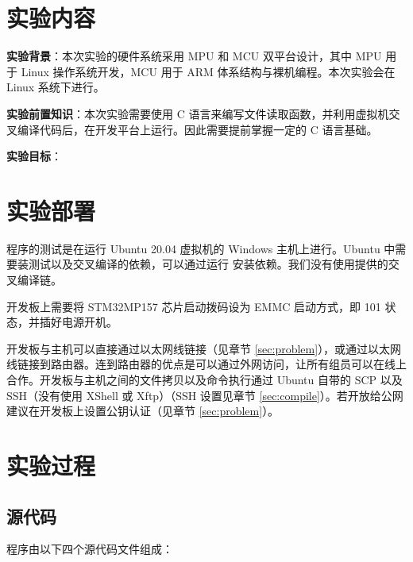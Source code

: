 
\section{实验内容}

\textbf{实验背景}：本次实验的硬件系统采用 MPU 和 MCU 双平台设计，其中 MPU 用于 Linux 操作系统开发，MCU 用于 ARM 体系结构与裸机编程。本次实验会在 Linux 系统下进行。

\textbf{实验前置知识}：本次实验需要使用 C 语言来编写文件读取函数，并利用虚拟机交叉编译代码后，在开发平台上运行。因此需要提前掌握一定的 C 语言基础。

\textbf{实验目标}：



\section{实验部署}

程序的测试是在运行 Ubuntu 20.04 虚拟机的 Windows 主机上进行。Ubuntu 中需要装测试以及交叉编译的依赖，可以通过运行  安装依赖。我们没有使用提供的交叉编译链。

开发板上需要将 STM32MP157 芯片启动拨码设为 EMMC 启动方式，即 101 状态，并插好电源开机。

开发板与主机可以直接通过以太网线链接（见章节 \ref{sec:problem}），或通过以太网线链接到路由器。连到路由器的优点是可以通过外网访问，让所有组员可以在线上合作。开发板与主机之间的文件拷贝以及命令执行通过 Ubuntu 自带的 SCP 以及 SSH（没有使用 XShell 或 Xftp）（SSH 设置见章节 \ref{sec:compile}）。若开放给公网建议在开发板上设置公钥认证（见章节 \ref{sec:problem}）。

\section{实验过程}

\subsection{源代码}

程序由以下四个源代码文件组成：

